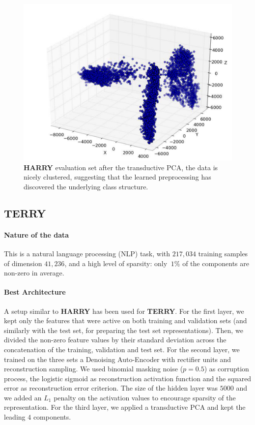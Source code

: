 \begin{figure}[t]
  \begin{center}
    \includegraphics[width=0.75\linewidth]{article1/images/harry_cluster.pdf}
    \caption{\label{fig:harry}  {\bf HARRY} evaluation set 
     after the transductive PCA, the data is nicely clustered, suggesting
     that the learned preprocessing has discovered the underlying class structure.}
    \vspace{-0.2in}
  \end{center}
 \vspace*{-1mm}
\end{figure}


\subsection{TERRY}


\paragraph{Nature of the data} This is a natural language processing
(NLP) task, with $217,034$ training samples of dimension $41,236$, and
a high level of sparsity: only $~1\%$ of the components are non-zero in average.


\paragraph{Best Architecture}

A setup similar to {\bf HARRY} has been used for {\bf TERRY}.  For the first layer, we kept
only the features that were active on both training and validation sets (and similarly
with the test set, for preparing the test set representations). Then, we
divided the non-zero feature values by their standard deviation across the
concatenation of the training, validation and test set.  For the
second layer, we trained on the three sets a Denoising Auto-Encoder with rectifier units and
reconstruction sampling.  We used binomial masking noise ($p=0.5$) as
corruption process, the logistic sigmoid as reconstruction activation function
and the squared error as reconstruction error criterion.  The size of the
hidden layer was $5000$ 
and we added an $L_1$ penalty on the activation values to encourage sparsity of
the representation.  For the third layer, we applied a transductive PCA and
kept the leading $4$ components.

